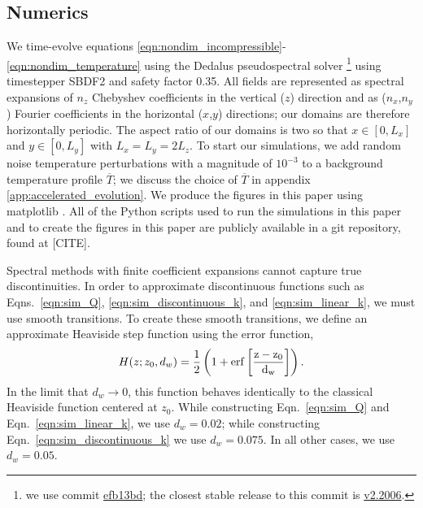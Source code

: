 \documentclass[twocolumn]{aastex631}
\begin{document}
\subsection{Numerics}
\label{sct:numerics}
We time-evolve equations \ref{eqn:nondim_incompressible}-\ref{eqn:nondim_temperature} using the Dedalus pseudospectral solver \citep{burns_etal_2020}\footnote{we use commit \href{https://github.com/DedalusProject/dedalus/commit/efb13bdaa09816dde3eee897bc2a15fc284ea2f1}{efb13bd}; the closest stable release to this commit is \href{https://github.com/DedalusProject/dedalus/releases/tag/v2.2006}{v2.2006}.} using timestepper SBDF2 \citep{wang&ruuth2008} and safety factor 0.35.
All fields are represented as spectral expansions of $n_z$ Chebyshev coefficients in the vertical ($z$) direction and as ($n_x$,$n_y$) Fourier coefficients in the horizontal ($x$,$y$) directions; our domains are therefore horizontally periodic.
The aspect ratio of our domains is two so that $x \in [0, L_x]$ and $y \in [0, L_y]$ with $L_x = L_y = 2 L_z$.
To start our simulations, we add random noise temperature perturbations with a magnitude of $10^{-3}$ to a background temperature profile $\overline{T}$; we discuss the choice of $\overline{T}$ in appendix \ref{app:accelerated_evolution}.
We produce the figures in this paper using matplotlib \citep{hunter2007, mpl3.3.4}.
All of the Python scripts used to run the simulations in this paper and to create the figures in this paper are publicly available in a git repository, found at [CITE].

Spectral methods with finite coefficient expansions cannot capture true discontinuities.
In order to approximate discontinuous functions such as Eqns.~\ref{eqn:sim_Q}, \ref{eqn:sim_discontinuous_k}, and \ref{eqn:sim_linear_k}, we must use smooth transitions.
To create these smooth transitions, we define an approximate Heaviside step function using the error function,
\begin{equation}
H(z; z_0, d_w) = \frac{1}{2}\left(1 + \rm{erf}\left[\frac{z - z_0}{d_w}\right]\right).
\label{eqn:heaviside}
\end{equation}
In the limit that $d_w \rightarrow 0$, this function behaves identically to the classical Heaviside function centered at $z_0$.
While constructing Eqn.~\ref{eqn:sim_Q} and Eqn.~\ref{eqn:sim_linear_k}, we use $d_w = 0.02$; while constructing Eqn.~\ref{eqn:sim_discontinuous_k} we use $d_w = 0.075$.
In all other cases, we use $d_w = 0.05$.
\end{document}
